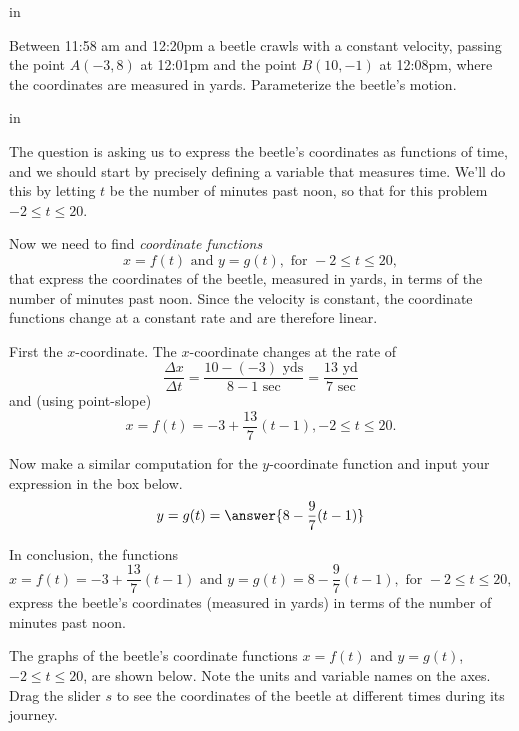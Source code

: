 \documentclass{ximera}
\newcommand{\pskip}{\vskip 0.1 in}
\begin{document}
\pskip

 Between 11:58 am and 12:20pm a beetle crawls with a constant velocity, passing the point $A(-3,8)$ at 12:01pm and the point $B(10,-1)$ at 12:08pm, where the coordinates are measured in yards. Parameterize the beetle's motion.

\pskip

 The question is asking us to express the beetle's coordinates as functions of time, and we should start by precisely defining a variable that measures time. We'll do this by letting $t$ be the number of minutes past noon, so that for this problem $-2 \leq t \leq 20$. 

Now we need to find \emph{coordinate functions}
\[
   x = f(t) \text{ and } y = g(t) , \text{ for } -2\leq t \leq 20 ,
\]
that express the coordinates of the beetle, measured in yards, in terms of the number of minutes past noon.  Since the velocity is constant, the coordinate functions change at a constant rate and are therefore linear.

First the $x$-coordinate. The $x$-coordinate changes at the rate of 
\[
    \frac{\Delta x}{\Delta t} = \frac{10-(-3) \text{ yds}}{8-1 \text{ sec}} = \frac{13 \text{ yd}}{7 \text{ sec}}
\]
and (using point-slope) 
\[
     x = f(t) = -3 + \frac{13}{7}(t-1) , -2\leq t \leq 20 .
\]


\begin{question} 
Now make a similar computation for the $y$-coordinate function and input your expression in the box below. 
\[
 y=g(t) =  \answer{8-\frac{9}{7}(t-1)} 
\]
    \end{question}

In conclusion, the functions
\[
    x = f(t) = -3 + \frac{13}{7}(t-1) \text{ and }  y=g(t) = 8-\frac{9}{7}(t-1) , \text{ for } -2\leq t \leq 20 ,
\]
express the beetle's coordinates (measured in yards) in terms of the number of minutes past noon.

\begin{exploration}\label{exp:pc1}
The graphs of the beetle's coordinate functions $x=f(t)$ and $y=g(t)$, $-2\leq t \leq 20$, are shown below. Note the units and variable names on the axes. Drag the slider $s$ to see the coordinates of the beetle at different times during its journey.
 
 
\begin{onlineOnly}
    \begin{center}
\end{center}
\end{onlineOnly}
\end{exploration}
\end{document}
